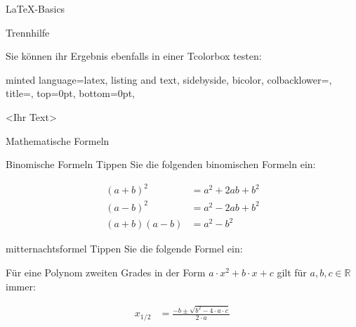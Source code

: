 \documentclass[
    inlineshortcut=java, %
    corporatedesign, %
    boxarc, %
]{algoexercise}
\begin{document}
\begin{task}[points=auto]{\LaTeX-Basics}
\begin{subtask*}[points=1]{Trennhilfe}
\begin{figure}[ht!]
                \label{fig:example-hyphenation}
            \end{figure}
            \FloatBarrier
            Sie können ihr Ergebnis ebenfalls in einer Tcolorbox testen:
            \begin{codeBlock}[
                escapeinside=||,
            ]{
                minted language=latex,
                listing and text,
                sidebyside,
                bicolor,
                colbacklower=,
                title=,
                top=0pt,
                bottom=0pt,
            }
            \begin{tcolorbox}[width=3cm]
                <Ihr Text>
            \end{tcolorbox}
        \end{codeBlock}
        \end{subtask*}
    \end{task}
    \begin{task}[points=auto]{Mathematische Formeln}
        \begin{subtask*}[points=3]{Binomische Formeln}
            Tippen Sie die folgenden binomischen Formeln ein:
            \begin{grayInfoBox}
                \begin{align}
                    (a+b)^2    & = a^2 + 2ab + b^2 \\
                    (a-b)^2    & = a^2 - 2ab + b^2 \\
                    (a+b)(a-b) & = a^2 - b^2
                \end{align}
            \end{grayInfoBox}
        \end{subtask*}
        \begin{subtask*}[points=1]{mitternachtsformel}
            Tippen Sie die folgende Formel ein:
            \begin{grayInfoBox}
                Für eine Polynom zweiten Grades in der Form $a\cdot x^2+b\cdot x + c$ gilt für $a,b,c \in \mathbb{R}$ immer:%

                \begin{align}
                    x_{1/2} & =\frac{-b\pm\sqrt{b^{2}-4\cdot a \cdot c}}{2\cdot a}
                \end{align}

            \end{grayInfoBox}
        \end{subtask*}
    \end{task}
\end{document}
